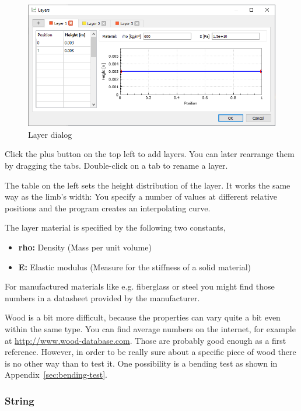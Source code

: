 \documentclass[12pt]{article}
\begin{document}
\begin{figure}[H]
\centering
\includegraphics[width=\textwidth]{figures/screenshots/input/layers}
\caption{Layer dialog}
\label{fig:width}
\end{figure}

Click the plus button on the top left to add layers. You can later rearrange them by dragging the tabs. Double-click on a tab to rename a layer.

The table on the left sets the height distribution of the layer. It works the same way as the limb's width: You specify a number of values at different relative positions and the program creates an interpolating curve.

The layer material is specified by the following two constants,

\begin{itemize}
\item \textbf{rho:} Density (Mass per unit volume)
\item \textbf{E:} Elastic modulus (Measure for the stiffness of a solid material)
\end{itemize}

For manufactured materials like e.g. fiberglass or steel you might find those numbers in a datasheet provided by the manufacturer.

Wood is a bit more difficult, because the properties can vary quite a bit even within the same type.
You can find average numbers on the internet, for example at \url{http://www.wood-database.com}.
Those are probably good enough as a first reference.
However, in order to be really sure about a specific piece of wood there is no other way than to test it.
One possibility is a bending test as shown in Appendix~\ref{sec:bending-test}.

\newpage
\subsubsection{String}
\end{document}
